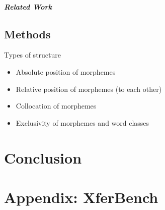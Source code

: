 \paragraph{Related Work}

\section{Methods}

Types of structure
\begin{itemize}
  \item Absolute position of morphemes
  \item Relative position of morphemes (to each other)
  \item Collocation of morphemes
  \item Exclusivity of morphemes and word classes
\end{itemize}



\chapter{Conclusion}



% 

\appendix

\chapter{Appendix: XferBench}




